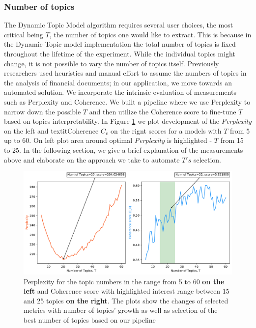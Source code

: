\documentclass[12pt,journal,letterpaper,oneside,onecolumn]{IEEEtran}
\begin{document}
\subsubsection{Number of topics}
The Dynamic Topic Model algorithm requires several user choices, the most critical being $T$, the number of topics one would like to extract. 
This is because in the Dynamic Topic model implementation the total number of topics is fixed throughout the lifetime of the experiment. While the individual topics might change, it is not possible to vary the number of topics itself.
Previously researchers \cite{ref_Neuhierl_2013}\cite{ref_ratku_2016}\cite{evaluation_10k}  used heuristics and manual effort to assume the numbers of topics in the analysis of financial documents; in our application, we move towards an automated solution. We incorporate the intrinsic evaluation of measurements such as Perplexity and Coherence. We built a pipeline where we use Perplexity to narrow down the possible $T$ and then utilize the Coherence score to fine-tune $T$ based on topics interpretability. In Figure \ref{fig:topic-num} we plot development of the \textit{Perplexity} on the left and textit{Coherence} $C_v$ on the rignt scores for a models with $T$ from 5 up to 60. On left plot area around optimal \textit{Perplexity} is highlighted - $T$ from 15 to 25. In the following section, we give a brief explanation of the measurements above and elaborate on the approach we take to automate $T's$ selection.

\begin{figure}
    \centering
	\includegraphics[width=0.9\linewidth]{images/t_scan_combined_plot.pdf}
	\caption{Perplexity for the topic numbers in the range from 5 to 60 \textbf{on the left} and Coherence score with highlighted interest range between 15 and 25 topics \textbf{on the right}. The plots show the changes of selected metrics with number of topics' growth as well as selection of the best number of topics based on our pipeline}
	\label{fig:topic-num}       
\end{figure}
\end{document}
